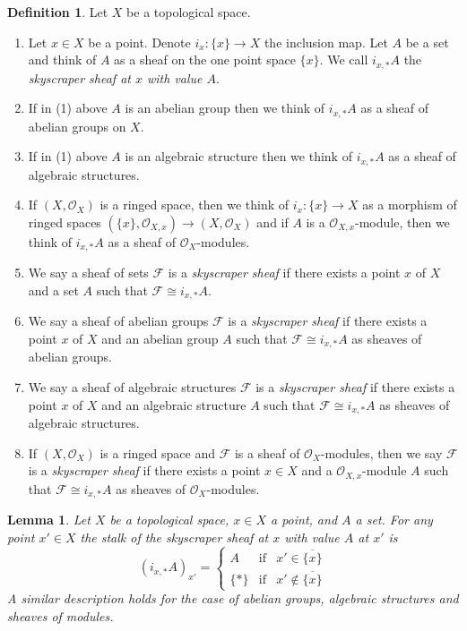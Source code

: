 \documentclass{stacks-project}
\theoremstyle{plain}
\newtheorem{lemma}[subsection]{Lemma}
\theoremstyle{definition}
\newtheorem{definition}[subsection]{Definition}
\theoremstyle{remark}
\numberwithin{equation}{subsection}
\begin{document}
\begin{definition}
\label{definition-skyscraper-sheaf}
Let $X$ be a topological space.
\begin{enumerate}
\item Let $x \in X$ be a point. Denote $i_x : \{x\} \to X$ the inclusion map.
Let $A$ be a set and think of $A$ as a sheaf on the one point space $\{x\}$.
We call $i_{x, *}A$ the {\it skyscraper sheaf at $x$ with value $A$}.
\item If in (1) above $A$ is an abelian group then we think of
$i_{x, *}A$ as a sheaf of abelian groups on $X$.
\item If in (1) above $A$ is an algebraic structure then we think
of $i_{x, *}A$ as a sheaf of algebraic structures.
\item If $(X, \mathcal{O}_X)$ is a ringed space, then we think
of $i_x : \{x\} \to X$ as a morphism of ringed spaces
$(\{x\}, \mathcal{O}_{X, x}) \to (X, \mathcal{O}_X)$
and if $A$ is a $\mathcal{O}_{X, x}$-module, then we think
of $i_{x, *}A$ as a sheaf of $\mathcal{O}_X$-modules.
\item We say a sheaf of sets $\mathcal{F}$ is a {\it skyscraper sheaf}
if there exists a point $x$ of $X$ and a set $A$ such
that $\mathcal{F} \cong i_{x, *}A$.
\item We say a sheaf of abelian groups $\mathcal{F}$ is a
{\it skyscraper sheaf} if there exists a point $x$ of $X$
and an abelian group $A$ such that $\mathcal{F} \cong i_{x, *}A$
as sheaves of abelian groups.
\item We say a sheaf of algebraic structures $\mathcal{F}$ is a
{\it skyscraper sheaf} if there exists a point $x$ of $X$
and an algebraic structure $A$ such that $\mathcal{F} \cong i_{x, *}A$
as sheaves of algebraic structures.
\item If $(X, \mathcal{O}_X)$ is a ringed space and
$\mathcal{F}$ is a sheaf of $\mathcal{O}_X$-modules, then
we say $\mathcal{F}$ is a {\it skyscraper sheaf} if there
exists a point $x \in X$ and a $\mathcal{O}_{X, x}$-module
$A$ such that $\mathcal{F} \cong i_{x, *}A$
as sheaves of $\mathcal{O}_X$-modules.
\end{enumerate}
\end{definition}

\begin{lemma}
\label{lemma-skyscraper-stalks}
Let $X$ be a topological space, $x \in X$ a point, and
$A$ a set. For any point $x' \in X$ the stalk of the
skyscraper sheaf at $x$ with value $A$ at $x'$ is
$$
(i_{x, *}A)_{x'} =
\left\{
\begin{matrix}
A & \text{if} & x' \in \overline{\{x\}} \\
\{*\} & \text{if} & x' \not\in \overline{\{x\}}
\end{matrix}
\right.
$$
A similar description holds for the case of
abelian groups, algebraic structures and
sheaves of modules.
\end{lemma}
\end{document}
